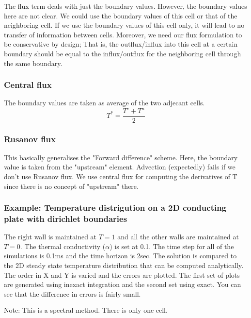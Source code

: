 \documentclass[11pt]{article}
\begin{document}
The flux term deals with just the boundary values. However, the boundary
values here are not clear. We could use the boundary values of this cell
or that of the neighboring cell. If we use the boundary values of this
cell only, it will lead to no transfer of information between cells.
Moreover, we need our flux formulation to be conservative by design;
That is, the outflux/influx into this cell at a certain boundary should
be equal to the influx/outflux for the neighboring cell through the same
boundary.

\subsubsection{Central flux}\label{central-flux}

The boundary values are taken as average of the two adjecant cells.
\[T^{*} = \frac{T^{e} + T^{n}}{2}\]

\subsubsection{Rusanov flux}\label{rusanov-flux}

This basically generalises the "Forward difference" scheme. Here, the
boundary value is taken from the "upstream" element. Advection
(expectedly) fails if we don't use Rusanov flux. We use central flux for
computing the derivatives of T since there is no concept of "upstream"
there.


    \subsubsection{Example: Temperature distrigution on a 2D conducting
plate with dirichlet
boundaries}\label{example-temperature-distrigution-on-a-2d-conducting-plate-with-dirichlet-boundaries}

The right wall is maintained at \(T = 1\) and all the other walls are
maintained at \(T = 0\). The thermal conductivity (\(\alpha\)) is set at
0.1. The time step for all of the simulations is 0.1ms and the time
horizon is 2sec. The solution is compared to the 2D steady state
temperature distribution that can be computed analytically. The order in
X and Y is varied and the errors are plotted. The first set of plots are
generated using inexact integration and the second set using exact. You
can see that the difference in errors is fairly small.

Note: This is a spectral method. There is only one cell.
\end{document}
